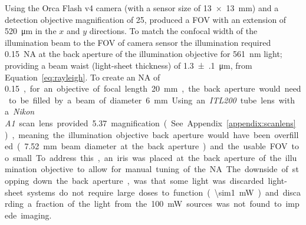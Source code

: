 Using the Orca Flash v4 camera (with a sensor size of \SI[product-units=repeat]{13x13}{\milli\meter}) and a detection objective magnification of \SI{25}{\times}, produced a \gls{FOV} with an extension of
\SI{520}{\micro\meter} in the \(x\) and \(y\) directions.
To match the confocal width of the illumination beam to the \gls{FOV} of camera sensor the illumination required \SI{0.15}{}~\gls{NA} at the back aperture of the illumination objective for \SI{561}{\nano\meter} light; providing a beam waist (\gls{light-sheet} thickness) of \SI{1.3(1)}{\micro\meter}, from Equation~\ref{eq:rayleigh}.
To create an \gls{NA} of \SI{0.15}, for an objective of focal length \SI{20}{\milli\meter}, the back aperture would need to be filled by a beam of diameter \SI{6}{\milli\meter}.

Using an \emph{ITL200} tube lens with a \emph{Nikon A1} scan lens provided \SI{5.37}{\times} magnification (See Appendix~\ref{appendix:scanlens}), meaning the illumination objective back aperture would have been overfilled (\SI{7.52}{\milli\meter} beam diameter at the back aperture) and the usable \gls{FOV} too small.
To address this, an iris was placed at the back aperture of the illumination objective to allow for manual tuning of the \gls{NA}.
The downside of stopping down the back aperture, was that some light was discarded
\Gls{light-sheet} systems do not require large doses to function (\SI{\sim1}{\milli\watt}) and discarding a fraction of the light from the \SI{100}{\milli\watt} sources was not found to impede imaging.



